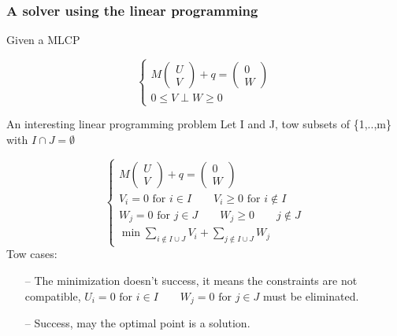 
\frame
{
\frametitle{A solver using the linear programming}
\begin{block}{ Given a MLCP}
 

\begin{equation}\label{eq:mlcp1}
 \begin{cases}
M \left(\begin{array}{c}
   U\\
   V
   \end{array}\right) + q = \left(\begin{array}{c}
   0\\
   W
   \end{array}\right) \\
      0 \le V \perp     W   \ge 0

      \end{cases}
\end{equation}


\end{block}

\begin{block}{An interesting linear programming problem}
Let I and J, tow subsets of \{1,..,m\} with  $I \cap J = \emptyset$

\begin{equation}\label{eq:mlcp1}
\begin{cases}
M \left(\begin{array}{c}
   U\\
   V
   \end{array}\right) + q = \left(\begin{array}{c}
   0\\
   W
   \end{array}\right)\\
V_i = 0 \textrm{ for } i \in I \qquad V_i \ge 0 \textrm{ for } i \notin I\\
W_j = 0 \textrm{ for } j \in J \qquad W_j \ge 0 \qquad j \notin J\\
\min{\sum_{i\notin I\cup J} V_i + \sum_{j\notin I\cup J} W_j}
\end{cases}
\end{equation}
Tow cases:\\
\begin{itemize}
 \item[--] The minimization doesn't success, it means the constraints are not compatible, $U_i =0 \textrm{ for } i \in I \qquad W_j=0 \textrm{ for } j\in J$ must be eliminated.\\
\item[--]Success, may the optimal point is a solution.
\end{itemize}

\end{block}

}

